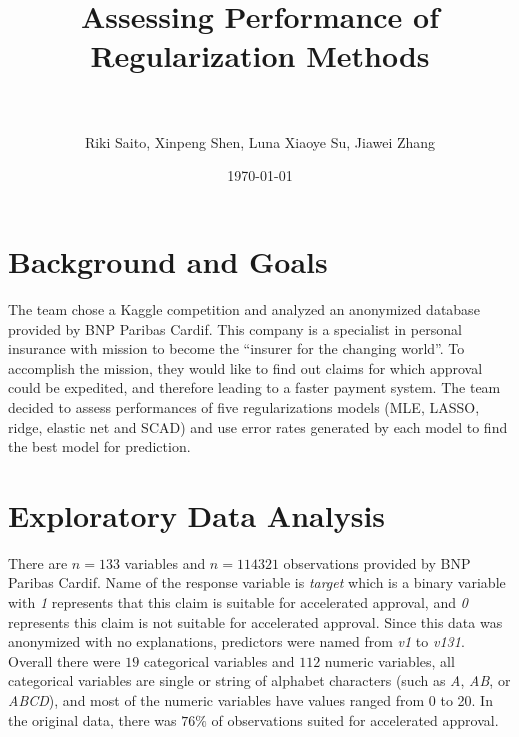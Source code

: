 \documentclass[paper=a4, fontsize=11pt]{scrartcl} %
\title{	
\normalfont \normalsize 
\textsc{} \\ [25pt] %
\horrule{1pt} \\[0.4cm] %
\huge Assessing Performance of Regularization Methods \\ %
\horrule{1pt} \\[0.5cm] %
}
\author{Riki Saito, Xinpeng Shen, Luna Xiaoye Su, Jiawei Zhang } %
\date{\normalsize\today} %
\numberwithin{equation}{section} %
\numberwithin{figure}{section} %
\numberwithin{table}{section} %
\begin{document}
\maketitle %

\section{Background and Goals}
The team chose a {\color{blue} Kaggle} competition and analyzed an anonymized database provided by BNP Paribas Cardif. This company is a specialist in personal insurance with mission to become the \enquote{insurer for the changing world}. To accomplish the mission, they would like to find out claims for which approval could be expedited, and therefore leading to a faster payment system. The team decided to assess performances of five regularizations models (MLE, LASSO, ridge, elastic net and SCAD) and use error rates generated by each model to find the best model for prediction.
\section{Exploratory Data Analysis}
There are $n=133$ variables and $n= 114321$ observations provided by BNP Paribas Cardif. Name of the response variable is \emph{target} which is a binary variable with \emph{1} represents that this claim is suitable for accelerated approval, and \emph{0} represents this claim is not suitable for accelerated approval. Since this data was anonymized with no explanations, predictors were named from \emph{v1} to \emph{v131}. Overall there were $19$ categorical variables and $112$ numeric variables, all categorical variables are single or string of alphabet characters (such as \emph{A}, \emph{AB}, or \emph{ABCD}), and most of the numeric variables have values ranged from 0 to 20. In the original data, there was $76\%$ of observations suited for accelerated approval.
\end{document}
